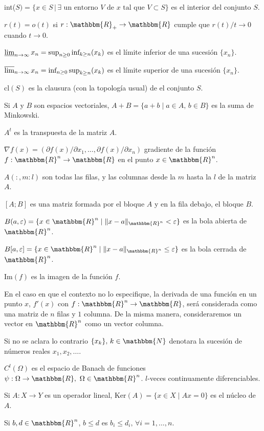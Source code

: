 \documentclass[a4paper,10pt]{book}
\newcommand{\N}{\mathbbm{N}}
\newcommand{\R}{\mathbbm{R}}
\newcommand{\Rn}{\R^n}
\newcommand{\arr}{\rightarrow}
\begin{document}
{int($S)=\{x\in S\,|\, \exists\mbox{ un entorno }V \mbox{ de }x\mbox{ tal que }V\subset S\}$ es  el interior del conjunto $S$.

$r(t)=o(t)$ si $r:\R_+\to\R$ cumple que $r(t)/t\to 0$ cuando $t\to0$.

$\varliminf_{n\to\infty}x_n=\sup_{n\geq0}\mbox{inf}_{k\geq n}(x_k)$ es el límite inferior de una sucesión $\{x_n\}$.

$\varlimsup_{n\to\infty}x_n=\mbox{inf}_{n\geq 0}\sup_{k\geq n}(x_k)$ es el límite superior de una sucesión $\{x_n\}$.

$\mbox{cl}(S)$ es la clausura (con la topología usual) de el conjunto $S$.

Si $A$ y $B$ son espacios vectoriales, $A+B=\{a+b\mid a\in A,\, b\in B\}$ es la suma de Minkowski.

$A^t$ es la transpuesta de la matriz $A$.

$\nabla f(x)=(\partial f(x)/\partial x_1,\ldots,\partial f(x)/\partial x_n)$ gradiente de la función $f:\Rn\arr\R$ en el punto $x\in\Rn$.

$A(:,m:l)$ son todas las filas, y las columnas desde la $m$ hasta la $l$ de la matriz $A$.

$[A;B]$ es una matriz formada por el bloque $A$ y en la fila debajo, el bloque $B$.

$B(a,\varepsilon)=\{x\in\Rn\mid \|x-a\|_{\Rn}<\varepsilon\}$ es la bola abierta de $\Rn$.

$B[a,\varepsilon]=\{x\in\Rn\mid \|x-a\|_{\Rn}\leq\varepsilon\}$ es la bola cerrada de $\Rn$.

$\mathrm{Im}(f)$ es la imagen de la función $f$. 

En el caso en que el contexto no lo especifique, la derivada de una función en un punto $x$, $f'(x)$ con $f:\Rn\arr\R$, será considerada como una matriz de $n$ filas y $1$ columna. De la misma manera, consideraremos un vector en $\Rn$ como un vector columna.

Si no se aclara lo contrario $\{x_k\},\, k\in\N$ denotara la sucesión de números reales $x_1,x_2,\ldots$.

$C^l(\Omega)$ es el espacio de Banach de funciones $\psi:\Omega\arr\R,\ \Omega\in\Rn$. $l$-veces continuamente diferenciables. 

Si $A:X\arr Y$ es un operador lineal, $\mathrm{Ker}(A)=\{x\in X\mid Ax=0\}$ es el núcleo de $A$.

Si $b,d\in\Rn$, $b\leq d$ es $b_i\leq d_i,\,\forall i=1,\ldots,n$.

}
\end{document}
